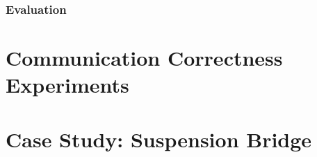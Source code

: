 \subsubsection{Evaluation}

\section{Communication Correctness Experiments}

\section{Case Study: Suspension Bridge}
